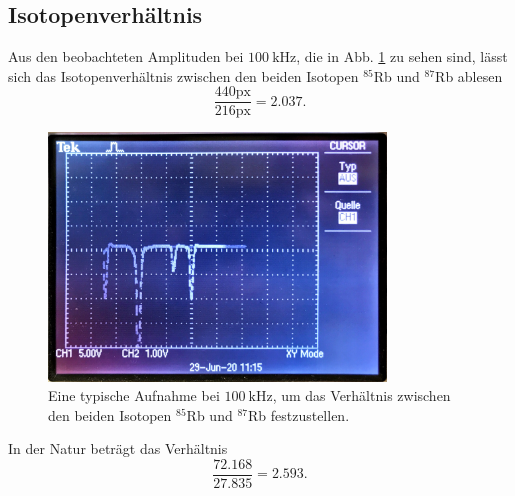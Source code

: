 \subsection{Isotopenverhältnis}
Aus den beobachteten Amplituden bei $\SI{100}{\kilo\hertz}$, die in Abb. \ref{fig:Aufnahme} zu sehen sind, lässt sich das Isotopenverhältnis zwischen den beiden Isotopen $^{85}$Rb und $^{87}$Rb ablesen
\begin{equation*}
    \frac{440\text{px}}{216\text{px}} = \num{2.037}. 
\end{equation*}
\begin{figure}
    \centering
    \includegraphics[width=0.8\textwidth]{fotos/Aufnahme.JPG}
    \caption{Eine typische Aufnahme bei $\SI{100}{\kilo\hertz}$, um das Verhältnis zwischen den beiden Isotopen $^{85}$Rb und $^{87}$Rb festzustellen.}
    \label{fig:Aufnahme}
\end{figure}
In der Natur beträgt das Verhältnis
\begin{equation*}
    \frac{\num{72.168}}{\num{27.835}} = \num{2.593}.
\end{equation*}
